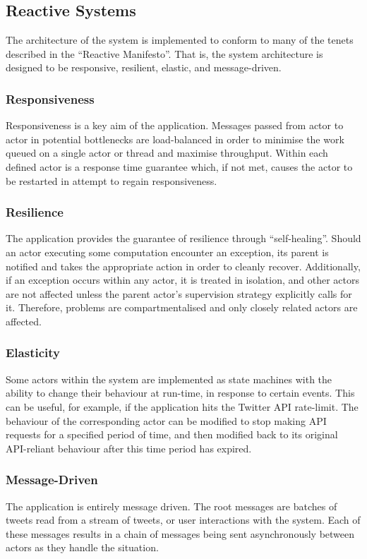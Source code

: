 \documentclass{l4proj}
\begin{document}
        \subsection{Reactive Systems}
        The architecture of the system is implemented to conform to many of the tenets described in the ``Reactive Manifesto''. That is, the system architecture is designed to be responsive, resilient, elastic, and message-driven.
        
            \subsubsection{Responsiveness}
            Responsiveness is a key aim of the application. Messages passed from actor to actor in potential bottlenecks are load-balanced in order to minimise the work queued on a single actor or thread and maximise throughput. Within each defined actor is a response time guarantee which, if not met, causes the actor to be restarted in attempt to regain responsiveness. 
            
            \subsubsection{Resilience}
            The application provides the guarantee of resilience through ``self-healing''. Should an actor executing some computation encounter an exception, its parent is notified and takes the appropriate action in order to cleanly recover. Additionally, if an exception occurs within any actor, it is treated in isolation, and other actors are not affected unless the parent actor's supervision strategy explicitly calls for it. Therefore, problems are compartmentalised and only closely related actors are affected.
            
            \subsubsection{Elasticity}
            Some actors within the system are implemented as state machines with the ability to change their behaviour at run-time, in response to certain events. This can be useful, for example, if the application hits the Twitter API rate-limit. The behaviour of the corresponding actor can be modified to stop making API requests for a specified period of time, and then modified back to its original API-reliant behaviour after this time period has expired.
            
            \subsubsection{Message-Driven}
            The application is entirely message driven. The root messages are batches of tweets read from a stream of tweets, or user interactions with the system. Each of these messages results in a chain of messages being sent asynchronously between actors as they handle the situation.       
        
\end{document}
